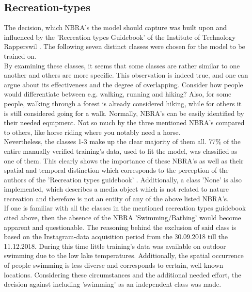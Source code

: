\subsection{Recreation-types} \label{recreation_types}
The decision, which NBRA's the model should capture was built upon and influenced by the 'Recreation types Guidebook' of the Institute of Technology Rapperswil \parencite{IFL2018}. The following seven distinct classes were chosen for the model to be trained on.\\
\newline
By examining these classes, it seems that some classes are rather similar to one another and others are more specific. This observation is indeed true, and one can argue about its effectiveness and the degree of overlapping. Consider how people would differentiate between e.g. walking, running and hiking? Also, for some people, walking through a forest is already considered hiking, while for others it is still considered going for a walk. Normally, NBRA's can be easily identified by their needed equipment. Not so much by the three mentioned NBRA's compared to others, like horse riding where you notably need a horse.\\
Nevertheless, the classes 1-3 make up the clear majority of them all. 77\% of the entire manually verified training's data, used to fit the model, was classified as one of them. This clearly shows the importance of these NBRA's as well as their spatial and temporal distinction which corresponds to the perception of the authors of the 'Recreation types guidebook' \parencite{IFL2018}.
Additionally, a class 'None' is also implemented, which describes a media object which is not related to nature recreation and therefore is not an entity of any of the above listed NBRA's.\\
\newline
If one is familiar with all the classes in the mentioned recreation types guidebook cited above, then the absence of the NBRA 'Swimming/Bathing' would become apparent and questionable. The reasoning behind the exclusion of said class is based on the Instagram-data acquisition period from the 30.09.2018 till the 11.12.2018. During this time little training's data was available on outdoor swimming due to the low lake temperatures. Additionally, the spatial occurrence of people swimming is less diverse and corresponds to certain, well known locations. Considering these circumstances and the additional needed effort, the decision against including 'swimming' as an independent class was made.

